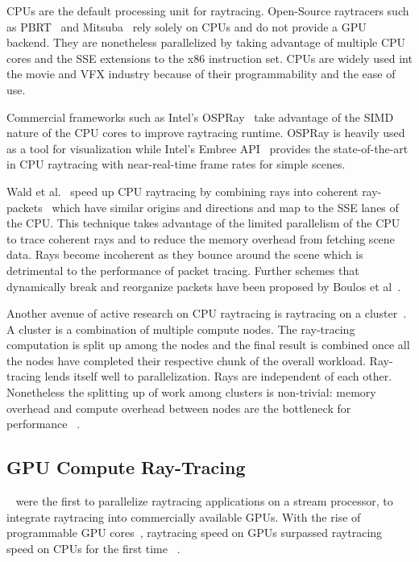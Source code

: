 CPUs are the default processing unit for raytracing. Open-Source raytracers such as PBRT~\cite{Pharr:2010:PBR:1854996} and Mitsuba~\cite{10.1145/3355089.3356498} rely solely on CPUs and do not provide a GPU backend. They are nonetheless parallelized by taking advantage of multiple CPU cores and the SSE extensions to the x86 instruction set. CPUs are widely used int the movie and VFX industry because of their programmability and the ease of use.

Commercial frameworks such as Intel's OSPRay~\cite{10.1109/TVCG.2016.2599041} take advantage of the SIMD nature of the CPU cores to improve raytracing runtime. OSPRay is heavily used as a tool for visualization while Intel's Embree API~\cite{10.1145/2601097.2601199} provides the state-of-the-art in CPU raytracing with near-real-time frame rates for simple scenes.

Wald et al.~\cite{article} speed up CPU raytracing by combining rays into coherent ray-packets~\cite{4634619, article_gunther_popov, article_benethin_boulos} which have similar origins and directions and map to the SSE lanes of the CPU. This technique takes advantage of the limited parallelism of the CPU to trace coherent rays and to reduce the memory overhead from fetching scene data.
Rays become incoherent as they bounce around the scene which is detrimental to the performance of packet tracing. Further schemes that dynamically break and reorganize packets have been proposed by Boulos et al~\cite{boulos:07:Packet, inproceedings}.

Another avenue of active research on CPU raytracing is raytracing on a cluster~\cite{inproceedings_mache_broadhurst, inproceedings_ize_brownlee}. A cluster is a combination of multiple compute nodes. The ray-tracing computation is split up among the nodes and the final result is combined once all the nodes have completed their respective chunk of the overall workload. Ray-tracing lends itself well to parallelization. Rays are independent of each other. Nonetheless the splitting up of work among clusters is non-trivial: memory overhead and compute overhead between nodes are the bottleneck for performance ~\cite{EGPGV:EGPGV12:061-070, wald2001interactive, doi:10.1111/1467-8659.t01-2-00710}. 

\subsection{GPU Compute Ray-Tracing}

~\cite{article_purcell} were the first to parallelize raytracing applications on a stream processor, to integrate raytracing into commercially available GPUs. With the rise of programmable GPU cores~\cite{Purcell:2002:RTO}, raytracing speed on GPUs surpassed raytracing speed on CPUs for the first time ~\cite{10.1145/566654.566640, 10.1145/2447976.2447997}.

